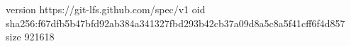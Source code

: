 version https://git-lfs.github.com/spec/v1
oid sha256:f67dfb5b47bfd92ab384a341327fbd293b42cb37a09d8a5c8a5f41cff6f4d857
size 921618
